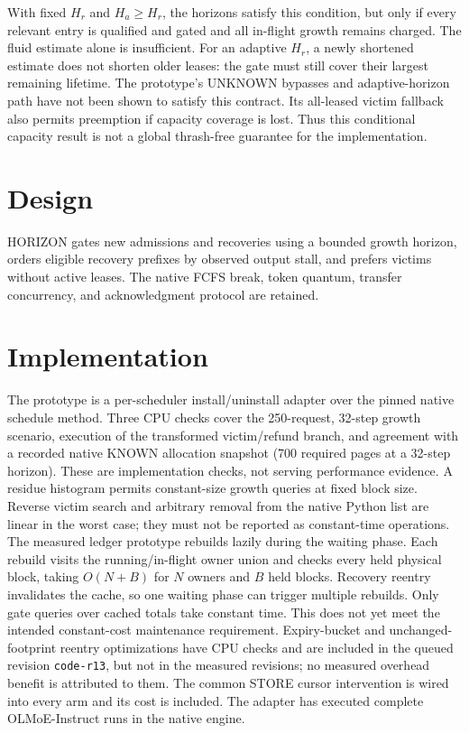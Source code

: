 \documentclass[11pt]{article}
\begin{document}
With fixed $H_r$ and $H_a\ge H_r$, the horizons satisfy this condition,
but only if every relevant entry is qualified and gated and all in-flight
growth remains charged. The fluid estimate alone is insufficient.
For an adaptive $H_r$, a newly shortened estimate does not shorten older
leases: the gate must still cover their largest remaining lifetime.
The prototype's UNKNOWN bypasses and adaptive-horizon path have not been
shown to satisfy this contract. Its all-leased victim fallback also
permits preemption if capacity coverage is lost. Thus this conditional
capacity result is not a global thrash-free guarantee for the implementation.
\section{Design}
HORIZON gates new admissions and recoveries using a bounded growth horizon,
orders eligible recovery prefixes by observed output stall, and prefers
victims without active leases. The native FCFS break, token quantum,
transfer concurrency, and acknowledgment protocol are retained.
\section{Implementation}
The prototype is a per-scheduler install/uninstall adapter over the pinned
native schedule method. Three CPU checks cover the 250-request, 32-step
growth scenario, execution of the transformed victim/refund branch, and
agreement with a recorded native KNOWN allocation snapshot (700 required
pages at a 32-step horizon). These are implementation checks, not serving
performance evidence. A residue histogram
permits constant-size growth queries at fixed block size. Reverse victim
search and arbitrary removal from the native Python list are linear in the
worst case; they must not be reported as constant-time operations.
The measured ledger prototype rebuilds lazily during the waiting phase.
Each rebuild visits the running/in-flight owner union and checks every held
physical block, taking $O(N+B)$ for $N$ owners and $B$ held blocks.
Recovery reentry invalidates the cache, so one waiting phase can trigger
multiple rebuilds. Only gate queries over cached totals take constant time.
This does not yet meet the intended constant-cost maintenance requirement.
Expiry-bucket and unchanged-footprint reentry optimizations have CPU
checks and are included in the queued revision \texttt{code-r13}, but not
in the measured revisions; no measured overhead benefit is attributed to
them. The common STORE
cursor intervention is wired into every arm and its cost is included.
The adapter has executed complete OLMoE-Instruct runs in the native engine.
\end{document}
